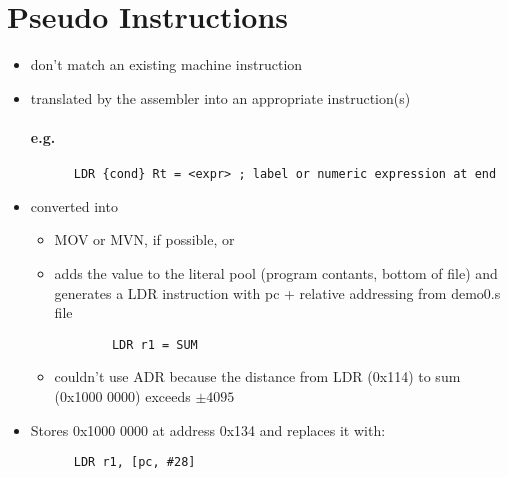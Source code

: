 \documentclass[12pt]{report}
\begin{document}
\section{Pseudo Instructions}
  \begin{itemize}
    \item don't match an existing machine instruction
    \item translated by the assembler into an appropriate instruction(s)
    \paragraph{e.g.}
    \begin{lstlisting}
      LDR {cond} Rt = <expr> ; label or numeric expression at end
    \end{lstlisting}
    \item converted into
    \begin{itemize}
      \item MOV or MVN, if possible, or
      \item adds the value to the literal pool (program contants, bottom of
      file) and generates a LDR instruction with pc + relative addressing from
      demo0.s file
      \begin{lstlisting}
        LDR r1 = SUM
      \end{lstlisting}
      \item couldn't use ADR because the distance from LDR (0x114) to sum (0x1000
      0000) exceeds $\pm 4095$
    \end{itemize}
    \item Stores 0x1000 0000 at address 0x134 and replaces it with:
    \begin{lstlisting}
      LDR r1, [pc, #28]
    \end{lstlisting}
  \end{itemize}
\end{document}
